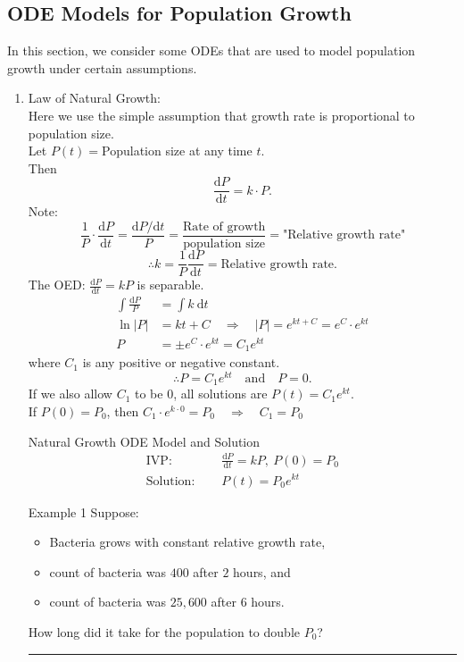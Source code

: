 \documentclass[12pt,a4paper]{article}
\def\d{{\mathrm{d}}}
\begin{document}
\subsection{ODE Models for Population Growth}
In this section, we consider some ODEs that are used to model population growth under certain assumptions. 
\begin{enumerate}
	\item Law of Natural Growth: \\
	Here we use the simple assumption that growth rate is proportional to population size. \\
	Let $P(t)=$Population size at any time $t$.\\
	Then $$\frac{\d P}{\d t}=k\cdot P.$$
	Note: $$\frac{1}{P}\cdot\frac{\d P}{\d t}=\frac{\d P/\d t}{P}=\frac{\text{Rate of growth}}{\text{population size}}=\text{"Relative growth rate"}$$
	$$\therefore k=\frac{1}{P}\frac{\d P}{\d t}=\text{Relative growth rate}.$$
	The OED: $\displaystyle\frac{\d P}{\d t}=kP$ is separable. 
	$$\begin{aligned}
		\int\frac{\d P}{P}&=\int k\ \d t\\
		\ln|P|&=kt+C\quad\Rightarrow\quad|P|=e^{kt+C}=e^C\cdot e^{kt}\\
		P&=\pm e^C\cdot e^{kt}=C_1e^{kt}
	\end{aligned}$$
	where $C_1$ is any positive or negative constant. 
	$$\therefore P=C_1e^{kt}\quad\text{and}\quad P=0.$$
	If we also allow $C_1$ to be 0, all solutions are $P(t)=C_1e^{kt}.$\\
	If $P(0)=P_0$, then $C_1\cdot e^{k\cdot 0}=P_0\quad\Rightarrow\quad C_1=P_0$
	\begin{thm}{Natural Growth ODE Model and Solution}
		$$\begin{aligned}
			\text{IVP: }&\quad\frac{\d P}{\d t}=kP,\ P(0)=P_0\\
			\text{Solution: }&\quad P(t)=P_0e^{kt}
		\end{aligned}$$	
	\end{thm}
	\begin{eg}{Example 1}
		Suppose: 
		\begin{itemize}
			\item Bacteria grows with constant relative growth rate, 
			\item count of bacteria was $400$ after $2$ hours, and
			\item count of bacteria was $25,600$ after $6$ hours. 	
		\end{itemize}
		How long did it take for the population to double $P_0$?
		\noindent\rule[0.25\baselineskip]{\textwidth}{1pt}

\end{eg}
\end{enumerate}
\end{document}
